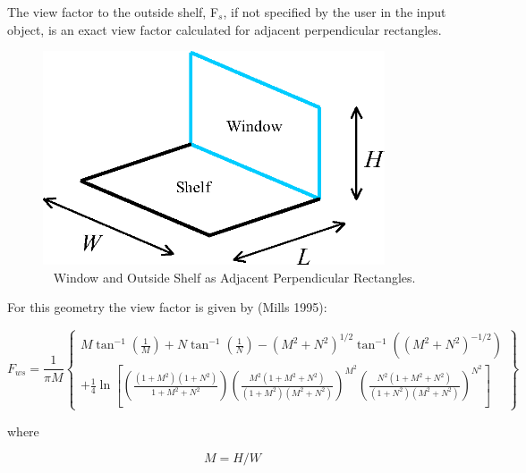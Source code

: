 The view factor to the outside shelf, F\(_{s}\), if not specified by the user in the input object, is an exact view factor calculated for adjacent perpendicular rectangles.

\begin{figure}[hbtp] %
\centering
\includegraphics[width=0.9\textwidth, height=0.9\textheight, keepaspectratio=true]{media/image899.png}
\caption{  Window and Outside Shelf as Adjacent Perpendicular Rectangles. \protect \label{fig:window-and-outside-shelf-as-adjacent}}
\end{figure}

For this geometry the view factor is given by (Mills 1995):

\begin{equation}
{F_{ws}} = \frac{1}{{\pi M}}\left\{ \begin{array}{l}M{\tan ^{ - 1}}\left( {\frac{1}{M}} \right) + N{\tan ^{ - 1}}\left( {\frac{1}{N}} \right) - {\left( {{M^2} + {N^2}} \right)^{1/2}}{\tan ^{ - 1}}\left( {{{\left( {{M^2} + {N^2}} \right)}^{ - 1/2}}} \right)\\ + \frac{1}{4}\ln \left[ {\left( {\frac{{\left( {1 + {M^2}} \right)\left( {1 + {N^2}} \right)}}{{1 + {M^2} + {N^2}}}} \right){{\left( {\frac{{{M^2}\left( {1 + {M^2} + {N^2}} \right)}}{{\left( {1 + {M^2}} \right)\left( {{M^2} + {N^2}} \right)}}} \right)}^{{M^2}}}{{\left( {\frac{{{N^2}\left( {1 + {M^2} + {N^2}} \right)}}{{\left( {1 + {N^2}} \right)\left( {{M^2} + {N^2}} \right)}}} \right)}^{{N^2}}}} \right]\end{array} \right\}
\end{equation}

where

\begin{equation}
M = H/W
\end{equation}

